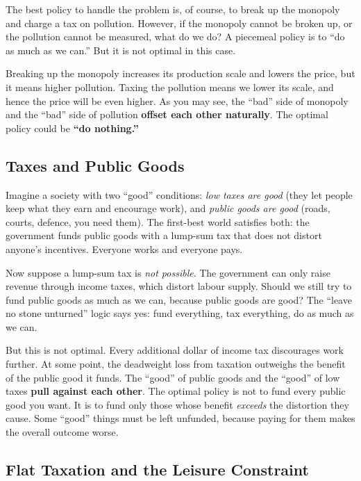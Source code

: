 \documentclass[11pt]{article}
\begin{document}
The best policy to handle the problem is, of course, to break up the monopoly and charge a tax on pollution. However, if the monopoly cannot be broken up, or the pollution cannot be measured, what do we do? A piecemeal policy is to ``do as much as we can.'' But it is not optimal in this case.

Breaking up the monopoly increases its production scale and lowers the price, but it means higher pollution. Taxing the pollution means we lower its scale, and hence the price will be even higher. As you may see, the ``bad'' side of monopoly and the ``bad'' side of pollution \textbf{offset each other naturally}. The optimal policy could be \textbf{``do nothing.''}

\subsection{Taxes and Public Goods}

Imagine a society with two ``good'' conditions: \textit{low taxes are good} (they let people keep what they earn and encourage work), and \textit{public goods are good} (roads, courts, defence, you need them). The first-best world satisfies both: the government funds public goods with a lump-sum tax that does not distort anyone's incentives. Everyone works and everyone pays.

Now suppose a lump-sum tax is \textit{not possible}. The government can only raise revenue through income taxes, which distort labour supply. Should we still try to fund public goods as much as we can, because public goods are good? The ``leave no stone unturned'' logic says yes: fund everything, tax everything, do as much as we can.

But this is not optimal. Every additional dollar of income tax discourages work further. At some point, the deadweight loss from taxation outweighs the benefit of the public good it funds. The ``good'' of public goods and the ``good'' of low taxes \textbf{pull against each other}. The optimal policy is not to fund every public good you want. It is to fund only those whose benefit \textit{exceeds} the distortion they cause. Some ``good'' things must be left unfunded, because paying for them makes the overall outcome worse.

\subsection{Flat Taxation and the Leisure Constraint}
\end{document}
